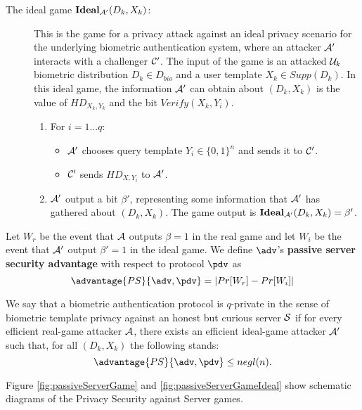 \begin{description}
\item[The ideal game $\mathbf{Ideal}_{\mathcal{A}'}(D_k,X_k)$:] This is the game for a privacy attack against an ideal
  privacy scenario for the underlying biometric authentication system, where an attacker $\mathcal{A}'$ interacts with a
  challenger $\mathcal{C}'$. The input of the game is an attacked $\mathcal{U}_k$ biometric distribution $D_k \in D_{bio}$ and a
  user template $X_k \in Supp(D_k)$. In this ideal game, the information $\mathcal{A}'$ can obtain about $(D_k,X_k)$ is the
  value of \(HD_{X_{k}, Y_{k}}\) and the bit $Verify(X_k,Y_i)$.
  \begin{enumerate}
  \item For $i = 1 \dots q$:
    \begin{itemize}
    \item $\mathcal{A}'$ chooses query template $Y_i \in \{0,1\}^n$ and sends it to $\mathcal{C}'$.
    \item $\mathcal{C}'$ sends $HD_{X,Y_{i}}$ to $\mathcal{A}'$.
    \end{itemize}
  \item $\mathcal{A}'$ output a bit $\beta'$, representing some information that
    $\mathcal{A}'$ has gathered about $(D_k,X_k)$. The game output is
    $\mathbf{Ideal}_{\mathcal{A}'}(D_k,X_k) = \beta'$.
  \end{enumerate}
\end{description}

Let \(W_{r}\) be the event that \(\mathcal{A}\) outputs $\beta = 1$ in the real game and let
\(W_{i}\) be the event that \(\mathcal{A}'\) output $\beta' = 1$ in the ideal game. We define
$\adv$'s \textbf{passive server security advantage} with respect to protocol $\pdv$ as
\[
\advantage{PS}{\adv,\pdv} = | Pr[W_{r}] - Pr[W_{i}]|
\]

\begin{definition}
   We say that a biometric authentication
  protocol is $q$-private in the sense of biometric template privacy against an
  honest but curious server $\mathcal{S}$ if for every efficient real-game attacker
  $\mathcal{A}$, there exists an efficient ideal-game attacker $\mathcal{A}'$ such
  that, for all $(D_k,X_k)$ the following stands:
  \[
    \advantage{PS}{\adv,\pdv} \leq negl(n).
  \]
\end{definition}

Figure \ref{fig:passiveServerGame} and \ref{fig:passiveServerGameIdeal} show
schematic diagrams of the Privacy Security against Server games.

